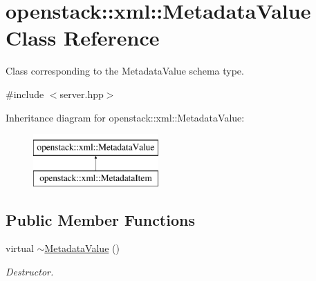 \hypertarget{classopenstack_1_1xml_1_1MetadataValue}{
\section{openstack::xml::MetadataValue Class Reference}
\label{classopenstack_1_1xml_1_1MetadataValue}
}


Class corresponding to the MetadataValue schema type.  




{\ttfamily \#include $<$server.hpp$>$}

Inheritance diagram for openstack::xml::MetadataValue:\begin{figure}[H]
\begin{center}
\leavevmode
\includegraphics[height=2.000000cm]{classopenstack_1_1xml_1_1MetadataValue}
\end{center}
\end{figure}
\subsection*{Public Member Functions}
\begin{DoxyCompactItemize}
\item 
\hypertarget{classopenstack_1_1xml_1_1MetadataValue_a8c8e958dffbd03c842b11e730575519f}{
virtual \hyperlink{classopenstack_1_1xml_1_1MetadataValue_a8c8e958dffbd03c842b11e730575519f}{$\sim$MetadataValue} ()}
\label{classopenstack_1_1xml_1_1MetadataValue_a8c8e958dffbd03c842b11e730575519f}

\begin{DoxyCompactList}\small\item\em Destructor. \item\end{DoxyCompactList}\end{DoxyCompactItemize}
